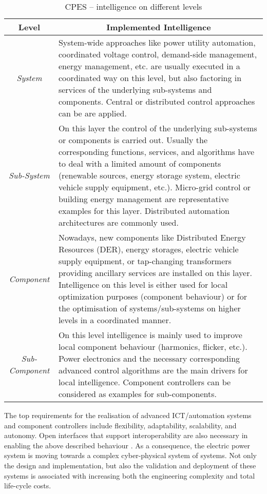 \documentclass[runningheads,a4paper]{llncs}
\begin{document}
\begin{table}[!htbp]
	\centering
	\caption{CPES -- intelligence on different levels}
	\label{tab:cpes-levels}
	\setlength{\tabcolsep}{0.5em} 
	{\renewcommand{\arraystretch}{1.25}
	\begin{tabular}{c|p{9.50cm}}
		\hline
		\textbf{Level} & \multicolumn{1}{c}{\textbf{Implemented Intelligence}} \\
		\hline
		\hline 
		\textit{System} & System-wide approaches like power utility automation, coordinated voltage control, demand-side management, energy management, etc. are usually executed in a coordinated way on this level, but also factoring in services of the underlying sub-systems and components. Central or distributed control approaches can be are applied. \\
		\hline 
		\textit{Sub-System} & On this layer the control of the underlying sub-systems or components is carried out. Usually the corresponding functions, services, and algorithms have to deal with a limited amount of components (renewable sources, energy storage system, electric vehicle supply equipment, etc.). Micro-grid control or building energy management are representative examples for this layer. Distributed automation architectures are commonly used. \\ 
		\hline 
		\textit{Component} & Nowadays, new components like Distributed Energy Resources (DER), energy storages, electric vehicle supply equipment, or tap-changing transformers providing ancillary services are installed on this layer. Intelligence on this level is either used for local optimization purposes (component behaviour) or for the optimisation of systems/sub-systems on higher levels in a coordinated manner. \\ 
		\hline 
		\textit{Sub-Component} & On this level intelligence is mainly used to improve  local component behaviour (harmonics, flicker, etc.). Power electronics and the necessary corresponding advanced control algorithms are the main drivers for local intelligence. Component controllers can be considered as examples for sub-components. \\ 
		\hline 
	\end{tabular}} 
\end{table}


The top requirements for the realisation of advanced ICT/automation systems and component controllers include flexibility, adaptability, scalability, and autonomy. Open interfaces that support interoperability are also necessary in enabling the above described behaviour \cite{Strasser:2015,Strasser:2013,Strasser:2017}. As a consequence, the electric power system is moving towards a complex cyber-physical system of systems. Not only the design and implementation, but also the validation and deployment of these systems is associated with increasing both the engineering complexity and total life-cycle costs.
\end{document}
